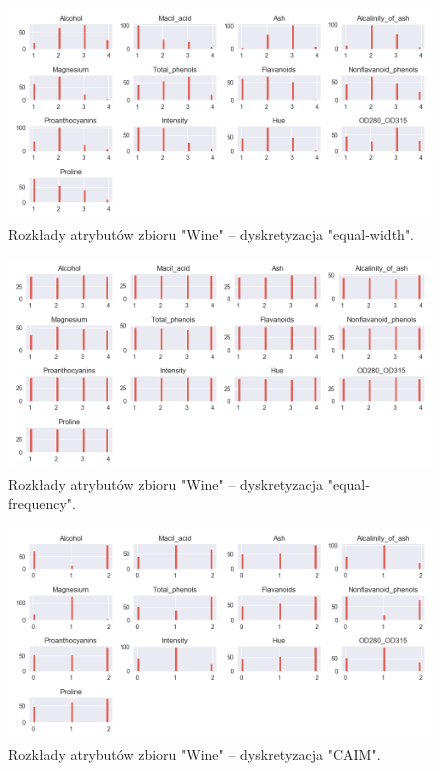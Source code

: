     \begin{figure}[H]
        \includegraphics[width=\textwidth]{img/discretization/ew_wine.png}
        \caption{Rozkłady atrybutów zbioru "Wine" -- dyskretyzacja "equal-width".}
    \end{figure}

    \begin{figure}[H]
        \includegraphics[width=\textwidth]{img/discretization/ef_wine.png}
        \caption{Rozkłady atrybutów zbioru "Wine" -- dyskretyzacja "equal-frequency".}
    \end{figure}

    \begin{figure}[H]
        \includegraphics[width=\textwidth]{img/discretization/caim_wine.png}
        \caption{Rozkłady atrybutów zbioru "Wine" -- dyskretyzacja "CAIM".}
    \end{figure}
